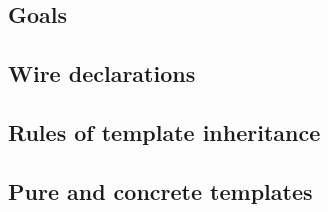 \documentclass{report}
\begin{document}


\subsection{Goals}

\subsection{Wire declarations}

\subsection{Rules of template inheritance}

\subsection{Pure and concrete templates}
\end{document}
